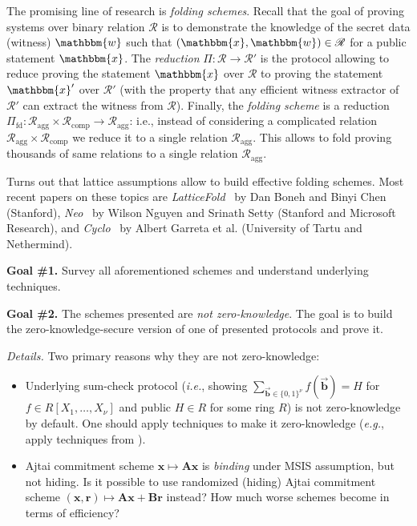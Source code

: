 \documentclass{template}
\begin{document}
The promising line of research is \textit{folding schemes}. Recall that the goal
of proving systems over binary relation $\mathcal{R}$ is to demonstrate the
knowledge of the secret data (witness) $\mathbbm{w}$ such that $(\mathbbm{x},
\mathbbm{w}) \in \mathcal{R}$ for a public statement $\mathbbm{x}$. The
\textit{reduction} $\Pi: \mathcal{R} \to \mathcal{R}'$ is the protocol allowing
to reduce proving the statement $\mathbbm{x}$ over $\mathcal{R}$ to proving the
statement $\mathbbm{x}'$ over $\mathcal{R}'$ (with the property that any
efficient witness extractor of $\mathcal{R}'$ can extract the witness from
$\mathcal{R}$). Finally, the \textit{folding scheme} is a reduction
$\Pi_{\text{fd}}: \mathcal{R}_{\text{agg}} \times \mathcal{R}_{\text{comp}} \to
\mathcal{R}_{\text{agg}}$: i.e., instead of considering a complicated relation
$\mathcal{R}_{\text{agg}} \times \mathcal{R}_{\text{comp}}$ we reduce it to a
single relation $\mathcal{R}_{\text{agg}}$. This allows to fold proving 
thousands of same relations to a single relation $\mathcal{R}_{\text{agg}}$.

Turns out that lattice assumptions allow to build effective folding schemes.
Most recent papers on these topics are
\textit{LatticeFold}~\cite{cryptoeprint:2024/257} by Dan Boneh and Binyi Chen
(Stanford), \textit{Neo}~\cite{cryptoeprint:2025/294} by Wilson Nguyen and Srinath Setty
(Stanford and Microsoft Research), and \textit{Cyclo}~\cite{cryptoeprint:2026/359} by
Albert Garreta et al. (University of Tartu and Nethermind). 

\textbf{Goal \#1.} Survey all aforementioned schemes and understand underlying techniques.

\textbf{Goal \#2.} The schemes presented are \textit{not zero-knowledge}. 
The goal is to build the zero-knowledge-secure version of one of presented protocols
and prove it.

\textit{Details.} Two primary reasons why they are not zero-knowledge:
\begin{itemize}
    \item Underlying sum-check protocol (\textit{i.e.}, showing
    $\sum_{\vec{\mathbf{b}} \in \{0,1\}^{\nu}} f(\vec{\mathbf{b}}) = H$ for $f \in R[X_1,\dots,X_{\nu}]$ and public $H \in R$ for some ring $R$) is not
    zero-knowledge by default. One should apply techniques to make it
    zero-knowledge (\textit{e.g.}, apply techniques from
    \cite{cryptoeprint:2017/305}).
    \item Ajtai commitment scheme $\mathbf{x} \mapsto \mathbf{Ax}$ is
    \textit{binding} under MSIS assumption, but not hiding. Is it possible to
    use randomized (hiding) Ajtai commitment scheme $(\mathbf{x},\mathbf{r}) \mapsto
    \mathbf{Ax}+\mathbf{Br}$ instead? How much worse schemes become in terms of efficiency?
\end{itemize}
\end{document}
